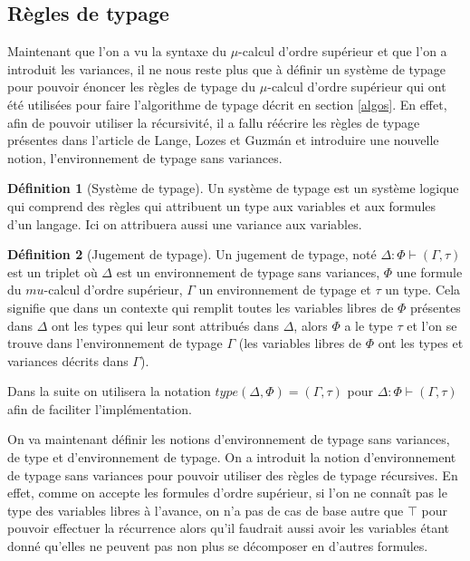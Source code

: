 \documentclass{rapport}
\theoremstyle{plain}
\theoremstyle{remark}
\theoremstyle{definition}
\newtheorem{dfn}{Définition}
\begin{document}
\subsection{Règles de typage\label{regles}}

Maintenant que l'on a vu la syntaxe du $\mu$-calcul d'ordre supérieur et que l'on a introduit les variances, il ne nous reste plus que à définir un système de typage pour pouvoir énoncer les règles de typage du $\mu$-calcul d'ordre supérieur qui ont été utilisées pour faire l'algorithme de typage décrit en section \ref{algos}. En effet, afin de pouvoir utiliser la récursivité, il a fallu réécrire les règles de typage présentes dans l'article de Lange, Lozes et Guzm{\'a}n \citep{lange2014model} et introduire une nouvelle notion, l'environnement de typage sans variances. 

\begin{dfn} [Système de typage] Un système de typage est un système logique qui comprend des règles qui attribuent un type aux variables et aux formules d'un langage. Ici on attribuera aussi une variance aux variables. 
\end{dfn}

\begin{dfn} [Jugement de typage] Un jugement de typage, noté $\Delta : \Phi \vdash (\Gamma, \tau)$ est un triplet où $\Delta$ est un environnement de typage sans variances, $\Phi$ une formule du $mu$-calcul d'ordre supérieur, $\Gamma$ un environnement de typage et $\tau$ un type. Cela signifie que dans un contexte qui remplit toutes les variables libres de $\Phi$ présentes dans $\Delta$ ont les types qui leur sont attribués dans $\Delta$, alors $\Phi$ a le type $\tau$ et l'on se trouve dans l'environnement de typage $\Gamma$ (les variables libres de $\Phi$ ont les types et variances décrits dans $\Gamma$).    
\end{dfn}

Dans la suite on utilisera la notation $type(\Delta, \Phi) = (\Gamma, \tau)$ pour ${\Delta : \Phi \vdash (\Gamma, \tau)}$ afin de faciliter l'implémentation.

On va maintenant définir les notions d'environnement de typage sans variances, de type et d'environnement de typage. On a introduit la notion d'environnement de typage sans variances pour pouvoir utiliser des règles de typage récursives. En effet, comme on accepte les formules d'ordre supérieur, si l'on ne connaît pas le type des variables libres à l'avance, on n'a pas de cas de base autre que $\top$ pour pouvoir effectuer la récurrence alors qu'il faudrait aussi avoir les variables étant donné qu'elles ne peuvent pas non plus se décomposer en d'autres formules.
\end{document}
